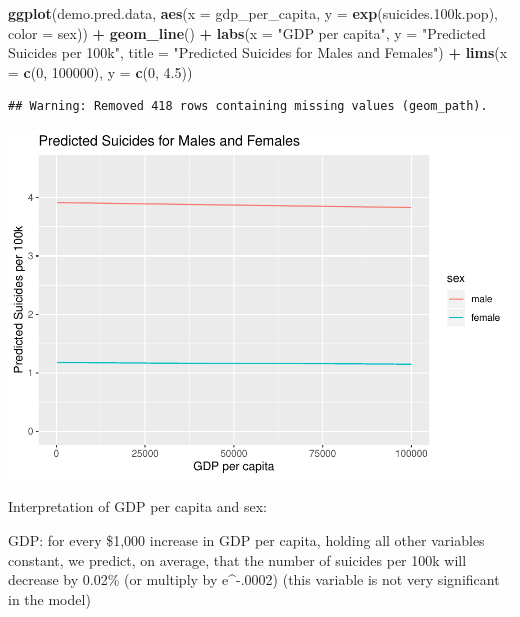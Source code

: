 \documentclass[11pt,]{article}
\newenvironment{Shaded}{\begin{snugshade}}{\end{snugshade}}
\newcommand{\DataTypeTok}[1]{\textcolor[rgb]{0.13,0.29,0.53}{#1}}
\newcommand{\DecValTok}[1]{\textcolor[rgb]{0.00,0.00,0.81}{#1}}
\newcommand{\FloatTok}[1]{\textcolor[rgb]{0.00,0.00,0.81}{#1}}
\newcommand{\KeywordTok}[1]{\textcolor[rgb]{0.13,0.29,0.53}{\textbf{#1}}}
\newcommand{\NormalTok}[1]{#1}
\newcommand{\OperatorTok}[1]{\textcolor[rgb]{0.81,0.36,0.00}{\textbf{#1}}}
\newcommand{\StringTok}[1]{\textcolor[rgb]{0.31,0.60,0.02}{#1}}
\begin{document}
\begin{Shaded}
\begin{Highlighting}[]
\KeywordTok{ggplot}\NormalTok{(demo.pred.data, }\KeywordTok{aes}\NormalTok{(}\DataTypeTok{x =}\NormalTok{ gdp_per_capita, }\DataTypeTok{y =} \KeywordTok{exp}\NormalTok{(suicides}\FloatTok{.100}\NormalTok{k.pop), }\DataTypeTok{color =}\NormalTok{ sex)) }\OperatorTok{+}\StringTok{ }
\StringTok{  }\KeywordTok{geom_line}\NormalTok{() }\OperatorTok{+}\StringTok{ }
\StringTok{  }\KeywordTok{labs}\NormalTok{(}\DataTypeTok{x =} \StringTok{"GDP per capita"}\NormalTok{, }\DataTypeTok{y =} \StringTok{"Predicted Suicides per 100k"}\NormalTok{, }\DataTypeTok{title =} \StringTok{"Predicted Suicides for Males and Females"}\NormalTok{) }\OperatorTok{+}
\StringTok{  }\KeywordTok{lims}\NormalTok{(}\DataTypeTok{x =} \KeywordTok{c}\NormalTok{(}\DecValTok{0}\NormalTok{, }\DecValTok{100000}\NormalTok{), }\DataTypeTok{y =} \KeywordTok{c}\NormalTok{(}\DecValTok{0}\NormalTok{, }\FloatTok{4.5}\NormalTok{))}
\end{Highlighting}
\end{Shaded}

\begin{verbatim}
## Warning: Removed 418 rows containing missing values (geom_path).
\end{verbatim}

\includegraphics{An-Analysis-of-Suicide-Data_files/figure-latex/unnamed-chunk-4-1.pdf}

Interpretation of GDP per capita and sex:

GDP: for every \$1,000 increase in GDP per capita, holding all other
variables constant, we predict, on average, that the number of suicides
per 100k will decrease by 0.02\% (or multiply by e\^{}-.0002) (this
variable is not very significant in the model)
\end{document}
